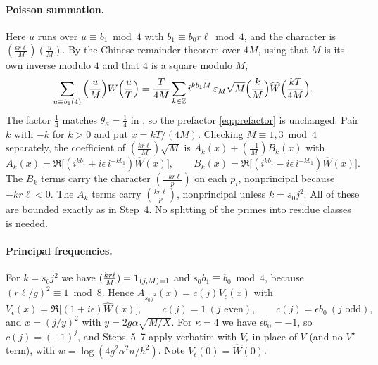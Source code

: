 \documentclass[11pt,colorlinks]{charlie}
\begin{document}
\paragraph{Poisson summation.}
Here $u$ runs over $u\equiv b_1\bmod 4$ with $b_1\equiv b_0r\ell\bmod4$, and the character is $(\tfrac{\epsilon r\ell}M)(\tfrac uM)$. By the Chinese remainder theorem over $4M$, using that $M$ is its own inverse modulo $4$ and that $4$ is a square modulo $M$,
\[
 \sum_{u\equiv b_1(4)}\Big(\frac uM\Big)W\Big(\frac uT\Big)=\frac T{4M}\sum_{k\in\mathbb{Z}}i^{kb_1M}\,\varepsilon_M\sqrt M\Big(\frac kM\Big)\widehat W\Big(\frac{kT}{4M}\Big).
\]
The factor $\frac14$ matches $\theta_\kappa=\frac14$ in , so the prefactor \eqref{eq:prefactor} is unchanged. Pair $k$ with $-k$ for $k>0$ and put $x=kT/(4M)$. Checking $M\equiv1,3\bmod4$ separately, the coefficient of $(\tfrac{kr\ell}M)\sqrt M$ is $A_k(x)+(\tfrac{-1}M)B_k(x)$ with
\[
 A_k(x)=\Re\big[(i^{kb_1}+i\epsilon\,i^{-kb_1})\widehat W(x)\big],\qquad B_k(x)=\Re\big[(i^{kb_1}-i\epsilon\,i^{-kb_1})\widehat W(x)\big].
\]
The $B_k$ terms carry the character $(\tfrac{-kr\ell}{p})$ on each $p_i$, nonprincipal because $-kr\ell<0$. The $A_k$ terms carry $(\tfrac{kr\ell}p)$, nonprincipal unless $k=s_0j^2$. All of these are bounded exactly as in Step~4. No splitting of the primes into residue classes is needed.

\paragraph{Principal frequencies.}
For $k=s_0j^2$ we have $(\tfrac{kr\ell}M)=\mathbf{1}_{(j,M)=1}$ and $s_0b_1\equiv b_0\bmod 4$, because $(r\ell/g)^2\equiv1\bmod 8$. Hence $A_{s_0j^2}(x)=c(j)V_\epsilon(x)$ with
\[
 V_\epsilon(x)=\Re\big[(1+i\epsilon)\widehat W(x)\big],\qquad c(j)=1\ (j\text{ even}),\qquad c(j)=\epsilon b_0\ (j\text{ odd}),
\]
and $x=(j/y)^2$ with $y=2g\alpha\sqrt{M/X}$. For $\kappa=4$ we have $\epsilon b_0=-1$, so $c(j)=(-1)^j$, and Steps~5--7 apply verbatim with $V_\epsilon$ in place of $V$ (and no $V^\star$ term), with $w=\log(4g^2\alpha^2n/h^2)$. Note $V_\epsilon(0)=\widehat W(0)$.
\end{document}
